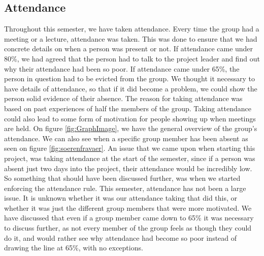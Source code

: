\subsection{Attendance}
Throughout this semester, we have taken attendance. 
Every time the group had a meeting or a lecture, attendance was taken. 
This was done to ensure that we had concrete details on when a person was present or not. 
If attendance came under 80\%, we had agreed that the person had to talk to the project leader and find out why their attendance had been so poor. 
If attendance came under 65\%, the person in question had to be evicted from the group. 
We thought it necessary to have details of attendance, so that if it did become a problem, we could show the person solid evidence of their absence. 
The reason for taking attendance was based on past experiences of half the members of the group. 
Taking attendance could also lead to some form of motivation for people showing up when meetings are held.
On figure \ref{fig:GraphImage}, we have the general overview of the group's attendance.
We can also see when a specific group member has been absent as seen on figure \ref{fig:soerenfravaer}.
An issue that we came upon when starting this project, was taking attendance at the start of the semester, since if a person was absent just two days into the project, their attendance would be incredibly low. 
So something that should have been discussed further, was when we started enforcing the attendance rule. 
This semester, attendance has not been a large issue. 
It is unknown whether it was our attendance taking that did this, or whether it was just the different group members that were more motivated.
We have discussed that even if a group member came down to 65\% it was necessary to discuss further, as not every member of the group feels as though they could do it, and would rather see why attendance had become so poor instead of drawing the line at 65\%, with no exceptions.

